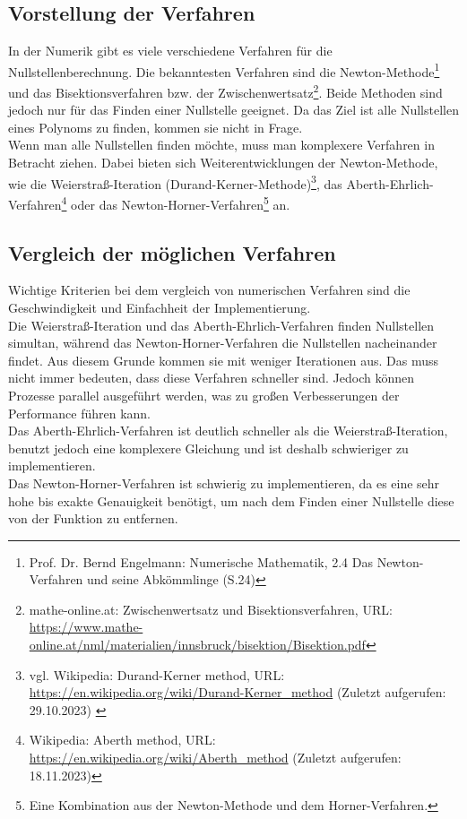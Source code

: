 \documentclass[12pt]{article}
\begin{document}
\subsection{Vorstellung der Verfahren}
In der Numerik gibt es viele verschiedene Verfahren für die Nullstellenberechnung. Die bekanntesten Verfahren sind die Newton-Methode\footnote{
    Prof. Dr. Bernd Engelmann: Numerische Mathematik, 2.4 Das Newton-Verfahren und seine Abkömmlinge (S.24)
} und das Bisektionsverfahren bzw. der Zwischenwertsatz\footnote{
    mathe-online.at: Zwischenwertsatz und Bisektionsverfahren, URL: \url{https://www.mathe-online.at/nml/materialien/innsbruck/bisektion/Bisektion.pdf}
}. Beide Methoden sind jedoch nur für das Finden einer Nullstelle geeignet. Da das Ziel ist alle Nullstellen eines Polynoms zu finden, kommen sie nicht in Frage.\\
Wenn man alle Nullstellen finden möchte, muss man komplexere Verfahren in Betracht ziehen. Dabei bieten sich Weiterentwicklungen der Newton-Methode, wie die Weierstraß-Iteration (Durand-Kerner-Methode)\footnote{
    vgl. Wikipedia: Durand-Kerner method, URL: \url{https://en.wikipedia.org/wiki/Durand-Kerner_method} (Zuletzt aufgerufen: 29.10.2023)
    \label{ftn:Wikipedia-Durand-Kerner-Method}
}, das Aberth-Ehrlich-Verfahren\footnote{
    Wikipedia: Aberth method, URL: \url{https://en.wikipedia.org/wiki/Aberth_method} (Zuletzt aufgerufen: 18.11.2023)
} oder das Newton-Horner-Verfahren\footnote{
    Eine Kombination aus der Newton-Methode und dem Horner-Verfahren.
} an.

\subsection{Vergleich der möglichen Verfahren}
Wichtige Kriterien bei dem vergleich von numerischen Verfahren sind die Geschwindigkeit und Einfachheit der Implementierung.\\
Die Weierstraß-Iteration und das Aberth-Ehrlich-Verfahren finden Nullstellen simultan, während das Newton-Horner-Verfahren die Nullstellen nacheinander findet. Aus diesem Grunde kommen sie mit weniger Iterationen aus. Das muss nicht immer bedeuten, dass diese Verfahren schneller sind. Jedoch können Prozesse parallel ausgeführt werden, was zu großen Verbesserungen der Performance führen kann.\\
Das Aberth-Ehrlich-Verfahren ist deutlich schneller als die Weierstraß-Iteration, benutzt jedoch eine komplexere Gleichung und ist deshalb schwieriger zu implementieren.\\
Das Newton-Horner-Verfahren ist schwierig zu implementieren, da es eine sehr hohe bis exakte Genauigkeit benötigt, um nach dem Finden einer Nullstelle diese von der Funktion zu entfernen.
\end{document}
